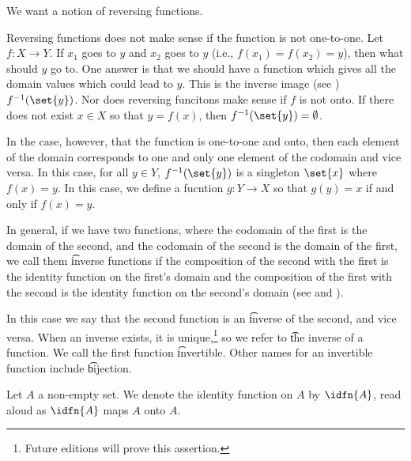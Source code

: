 

We want a notion of reversing functions.


Reversing functions does not make sense if the function is not one-to-one.
Let $f: X \to Y$.
If $x_1$ goes to $y$ and $x_2$ goes to $y$ (i.e., $f(x_1) = f(x_2) = y$), then what should $y$ go to.
One answer is that we should have a function which gives all the domain values which could lead to $y$.
This is the inverse image (see ) $f^{-1}(\set{y})$.
Nor does reversing funcitons make sense if $f$ is not onto.
If there does not exist $x \in X$ so that $y = f(x)$, then $f^{-1}(\set{y}) = \emptyset$.

In the case, however, that the function is one-to-one and onto, then each element of the domain corresponds to one and only one element of the codomain and vice versa.
In this case, for all $y \in Y$, $f^{-1}(\set{y})$ is a singleton $\set{x}$ where $f(x) = y$.
In this case, we define a fucntion $g: Y \to X$ so that $g(y) = x$ if and only if $f(x) = y$.


In general, if we have two functions, where the codomain of the first is the domain of the second, and the codomain of the second is the domain of the first, we call them \t{inverse functions} if the composition of the second with the first is the identity function on the first's domain and the composition of the first with the second is the identity function on the second's domain (see  and ).

In this case we say that the second function is an \t{inverse} of the second, and vice versa.
When an inverse exists, it is unique,\footnote{Future editions will prove this assertion.} so we refer to \t{the inverse} of a function.
We call the first function \t{invertible}.
Other names for an invertible function include \t{bijection}.


Let $A$ a non-empty set.
We denote the identity
function on $A$ by $\idfn{A}$,
read aloud as
$\idfn{A}$ maps $A$ onto $A$.

